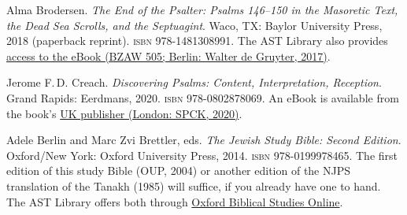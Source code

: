 \documentclass[titlepage]{article}
\begin{document}
\begingroup
\renewcommand{\section}[2]{}%
\begin{thebibliography}{Brodersen}%

	 Alma Brodersen.
	\emph{The End of the Psalter: Psalms 146–150 in the Masoretic Text, the Dead Sea Scrolls, and the Septuagint}.
	Waco, TX: Baylor University Press, 2018 (paperback reprint).
	\textsc{isbn} 978-1481308991.
	The AST Library also provides \href{https://ebookcentral.proquest.com/lib/astheology/detail.action?docID=4895035}{access to the eBook (BZAW 505; Berlin: Walter de Gruyter, 2017)}.

	 Jerome F.\,D. Creach.
	\emph{Discovering Psalms: Content, Interpretation, Reception}.
	Grand Rapids: Eerdmans, 2020.
	\textsc{isbn} 978-0802878069.
	An eBook is available from the book’s \href{https://spckpublishing.co.uk/discovering-the-psalms}{UK publisher (London: SPCK, 2020)}.

	Adele Berlin and Marc Zvi Brettler, eds.
	\emph{The Jewish Study Bible: Second Edition}.
	Oxford/New York: Oxford University Press, 2014.
	\textsc{isbn} 978-0199978465.
	The first edition of this study Bible (OUP, 2004) or another edition of the NJPS translation of the Tanakh (1985) will suffice, if you already have one to hand. The AST Library offers both through \href{http://www.oxfordbiblicalstudies.com.ezproxy.astheology.ns.ca:2048/article/book/obso-9780195297515/obso-9780195297515-chapter-27}{Oxford Biblical Studies Online}.

%
%


\end{thebibliography}
\endgroup
\end{document}

